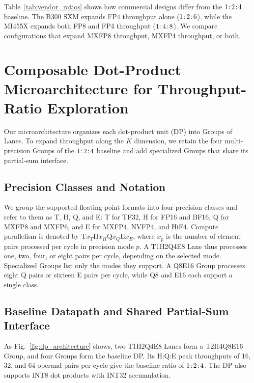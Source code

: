 \documentclass[conference,10pt,letterpaper]{IEEEtran}
\DeclareRobustCommand{\tpratio}[3]{\ensuremath{#1\mkern2mu{:}\mkern2mu#2\mkern2mu{:}\mkern2mu#3}}
\begin{document}
Table~\ref{tab:vendor_ratios} shows how commercial designs differ from the \tpratio{1}{2}{4} baseline. The B300 SXM expands FP4 throughput alone (\tpratio{1}{2}{6}), while the MI455X expands both FP8 and FP4 throughput (\tpratio{1}{4}{8}). We compare configurations that expand MXFP8 throughput, MXFP4 throughput, or both.

\section{Composable Dot-Product Microarchitecture for Throughput-Ratio Exploration}
\label{sec:architecture}
\label{sec:brick_definition}

Our microarchitecture organizes each dot-product unit (DP) into Groups of Lanes. To expand throughput along the $K$ dimension, we retain the four multi-precision Groups of the \tpratio{1}{2}{4} baseline and add specialized Groups that share its partial-sum interface.

\subsection{Precision Classes and Notation}
\label{sec:notation_conventions}

We group the supported floating-point formats into four precision classes and refer to them as T, H, Q, and E: T for TF32, H for FP16 and BF16, Q for MXFP8 and MXFP6, and E for MXFP4, NVFP4, and HiF4. Compute parallelism is denoted by $\mathrm{T}x_T\mathrm{H}x_H\mathrm{Q}x_Q\mathrm{E}x_E$, where $x_p$ is the number of element pairs processed per cycle in precision mode $p$. A T1H2Q4E8 Lane thus processes one, two, four, or eight pairs per cycle, depending on the selected mode. Specialized Groups list only the modes they support. A Q8E16 Group processes eight Q pairs or sixteen E pairs per cycle, while Q8 and E16 each support a single class.

\subsection{Baseline Datapath and Shared Partial-Sum Interface}
\label{sec:unpack_recode}
\label{sec:full_brick}

As Fig.~\ref{fig:dp_architecture} shows, two T1H2Q4E8 Lanes form a T2H4Q8E16 Group, and four Groups form the baseline DP. Its H:Q:E peak throughputs of 16, 32, and 64 operand pairs per cycle give the baseline ratio of \tpratio{1}{2}{4}. The DP also supports INT8 dot products with INT32 accumulation.
\end{document}
